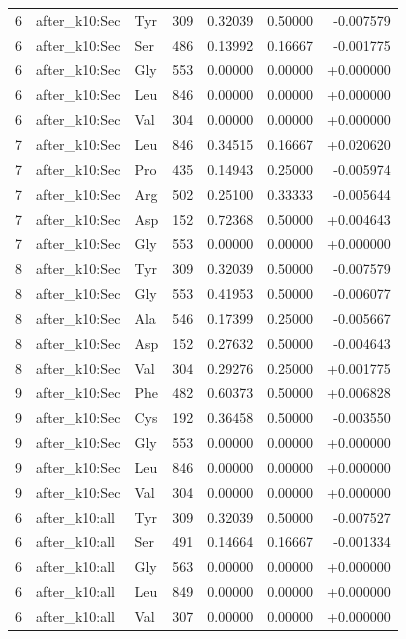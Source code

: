 \begin{longtable}{r l l r r r r}
6 & after\_k10:Sec & Tyr & 309 & 0.32039 & 0.50000 & -0.007579 \\
6 & after\_k10:Sec & Ser & 486 & 0.13992 & 0.16667 & -0.001775 \\
6 & after\_k10:Sec & Gly & 553 & 0.00000 & 0.00000 & +0.000000 \\
6 & after\_k10:Sec & Leu & 846 & 0.00000 & 0.00000 & +0.000000 \\
6 & after\_k10:Sec & Val & 304 & 0.00000 & 0.00000 & +0.000000 \\
7 & after\_k10:Sec & Leu & 846 & 0.34515 & 0.16667 & +0.020620 \\
7 & after\_k10:Sec & Pro & 435 & 0.14943 & 0.25000 & -0.005974 \\
7 & after\_k10:Sec & Arg & 502 & 0.25100 & 0.33333 & -0.005644 \\
7 & after\_k10:Sec & Asp & 152 & 0.72368 & 0.50000 & +0.004643 \\
7 & after\_k10:Sec & Gly & 553 & 0.00000 & 0.00000 & +0.000000 \\
8 & after\_k10:Sec & Tyr & 309 & 0.32039 & 0.50000 & -0.007579 \\
8 & after\_k10:Sec & Gly & 553 & 0.41953 & 0.50000 & -0.006077 \\
8 & after\_k10:Sec & Ala & 546 & 0.17399 & 0.25000 & -0.005667 \\
8 & after\_k10:Sec & Asp & 152 & 0.27632 & 0.50000 & -0.004643 \\
8 & after\_k10:Sec & Val & 304 & 0.29276 & 0.25000 & +0.001775 \\
9 & after\_k10:Sec & Phe & 482 & 0.60373 & 0.50000 & +0.006828 \\
9 & after\_k10:Sec & Cys & 192 & 0.36458 & 0.50000 & -0.003550 \\
9 & after\_k10:Sec & Gly & 553 & 0.00000 & 0.00000 & +0.000000 \\
9 & after\_k10:Sec & Leu & 846 & 0.00000 & 0.00000 & +0.000000 \\
9 & after\_k10:Sec & Val & 304 & 0.00000 & 0.00000 & +0.000000 \\
6 & after\_k10:all & Tyr & 309 & 0.32039 & 0.50000 & -0.007527 \\
6 & after\_k10:all & Ser & 491 & 0.14664 & 0.16667 & -0.001334 \\
6 & after\_k10:all & Gly & 563 & 0.00000 & 0.00000 & +0.000000 \\
6 & after\_k10:all & Leu & 849 & 0.00000 & 0.00000 & +0.000000 \\
6 & after\_k10:all & Val & 307 & 0.00000 & 0.00000 & +0.000000 \\

\end{longtable}
